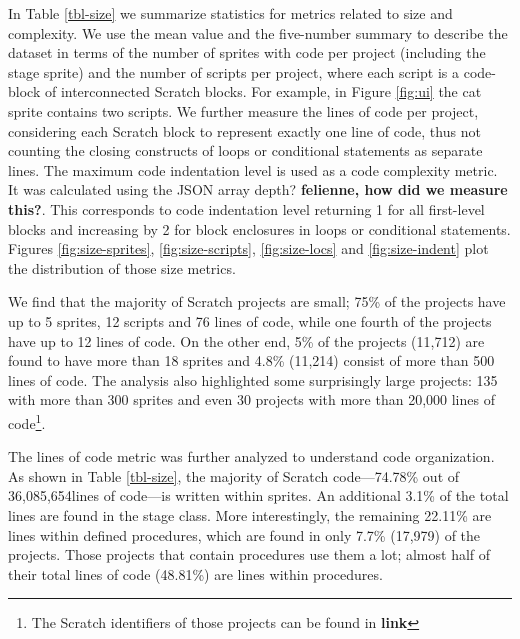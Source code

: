 \documentclass{sig-alternate}
\newcommand{\nLOC}{36,085,654}
\newcommand{\todo}[1]{\textbf{#1}}
\begin{document}
In Table \ref{tbl-size} we summarize statistics for metrics related to size and complexity. We use the mean value and the five-number summary to describe the dataset in terms of the number of sprites with code per project (including the stage sprite) and the number of scripts per project, where each script is a code-block of interconnected Scratch blocks. For example, in Figure \ref{fig:ui} the cat sprite contains two scripts. We further measure the lines of code per project, considering each Scratch block to represent exactly one line of code, thus not counting the closing constructs of loops or conditional statements as separate lines. The maximum code indentation level is used as a code complexity metric. It was calculated using the JSON array depth? \todo{felienne, how did we measure this?}. This corresponds to code indentation level returning 1 for all first-level blocks and increasing by 2 for block enclosures in loops or conditional statements. Figures \ref{fig:size-sprites}, \ref{fig:size-scripts}, \ref{fig:size-locs} and \ref{fig:size-indent} plot the distribution of those size metrics.

We find that the majority of Scratch projects are small; 75\% of the projects have up to 5 sprites, 12 scripts and 76 lines of code, while one fourth of the projects have up to 12 lines of code. On the other end, 5\% of the projects (11,712) are found to have more than 18 sprites and 4.8\% (11,214) consist of more than 500 lines of code. The analysis also highlighted some surprisingly large projects: 135 with more than 300 sprites and even 30 projects with more than 20,000 lines of code\footnote{The Scratch identifiers of those projects can be found in \todo{link}}.

The lines of code metric was further analyzed to understand code organization. As shown in Table \ref{tbl-size}, the majority of Scratch code---74.78\% out of \nLOC lines of code---is written within sprites. An additional 3.1\% of the total lines are found in the stage class. More interestingly, the remaining 22.11\% are lines within defined procedures, which are found in only 7.7\% (17,979) of the projects. Those projects that contain procedures use them a lot; almost half of their total lines of code (48.81\%) are lines within procedures.
\end{document}
